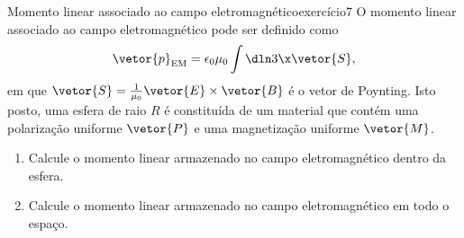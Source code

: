 \begin{exercício}{Momento linear associado ao campo eletromagnético}{exercício7}
    O momento linear associado ao campo eletromagnético pode ser definido como
    \begin{equation*}
        \vetor{p}_{\mathrm{EM}} = \epsilon_0 \mu_0 \int \dln3\x \vetor{S},
    \end{equation*}
    em que \(\vetor{S} = \frac{1}{\mu_0} \vetor{E}\times\vetor{B}\) é o vetor de Poynting. Isto posto, uma esfera de raio \(R\) é constituída de um material que contém uma polarização uniforme \(\vetor{P}\) e uma magnetização uniforme \(\vetor{M}\).
    \begin{enumerate}[label=(\alph*)]
        \item Calcule o momento linear armazenado no campo eletromagnético dentro da esfera.
        \item Calcule o momento linear armazenado no campo eletromagnético em todo o espaço.
    \end{enumerate}
\end{exercício}
